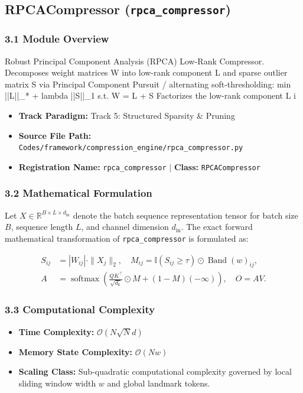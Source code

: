 \subsection{RPCACompressor (\texttt{rpca\_compressor})}
\label{sec:app_module_rpca_compressor}

\subsubsection*{3.1 Module Overview}
Robust Principal Component Analysis (RPCA) Low-Rank Compressor.  Decomposes weight matrices W into low-rank component L and sparse outlier matrix S via Principal Component Pursuit / alternating soft-thresholding:     min ||L||\_* + lambda ||S||\_1  s.t.  W = L + S Factorizes the low-rank component L i
\begin{itemize}
    \item \textbf{Track Paradigm:} Track 5: Structured Sparsity & Pruning
    \item \textbf{Source File Path:} \texttt{Codes/framework/compression\_engine/rpca\_compressor.py}
    \item \textbf{Registration Name:} \texttt{rpca\_compressor} $\mid$ \textbf{Class:} \texttt{RPCACompressor}
\end{itemize}

\subsubsection*{3.2 Mathematical Formulation}
Let $X \in \mathbb{R}^{B \times L \times d_{\text{in}}}$ denote the batch sequence representation tensor for batch size $B$, sequence length $L$, and channel dimension $d_{\text{in}}$. The exact forward mathematical transformation of \texttt{rpca\_compressor} is formulated as:

\begin{align}
S_{ij} &= |W_{ij}| \cdot \|X_j\|_2, \quad M_{ij} = \mathbb{I}(S_{ij} \ge \tau) \odot \operatorname{Band}(w)_{ij}, \\
A &= \operatorname{softmax}\left(\frac{Q K^\top}{\sqrt{d_k}} \odot M + (1 - M)(-\infty)\right), \quad O = A V.
\end{align}


\subsubsection*{3.3 Computational Complexity}
\begin{itemize}
    \item \textbf{Time Complexity:} $\mathcal{O}(N \sqrt{N} d)$
    \item \textbf{Memory State Complexity:} $\mathcal{O}(N w)$
    \item \textbf{Scaling Class:} Sub-quadratic computational complexity governed by local sliding window width $w$ and global landmark tokens.
\end{itemize}

